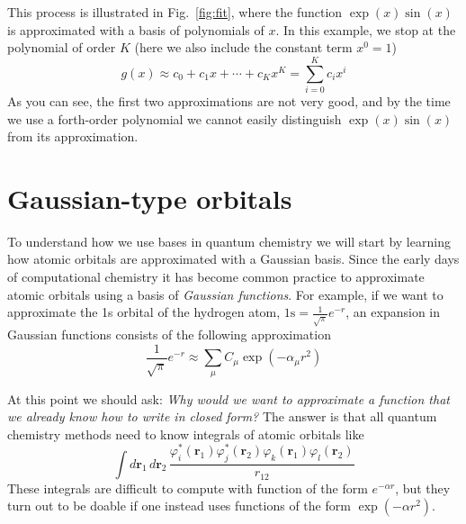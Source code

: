 \documentclass[../Main/chem371-notes.tex]{subfiles}
\begin{document}
This process is illustrated in Fig.~\ref{fig:fit}, where the function $\exp(x) \sin(x)$ is approximated with a basis of polynomials of $x$.
In this example, we stop at the polynomial of order $K$ (here we also include the constant term $x^0 = 1$)
\begin{equation}
g(x) \approx  c_0 +  c_1 x + \cdots + c_K x^{K} = \sum_{i=0}^{K} c_i x^{i}
\end{equation}
As you can see, the first two approximations are not very good, and by the time we use a forth-order polynomial we cannot easily distinguish $\exp(x) \sin(x)$ from its approximation.

\section{Gaussian-type orbitals}

To understand how we use bases in quantum chemistry we will start by learning how atomic orbitals are approximated with a Gaussian basis.
Since the early days of computational chemistry it has become common practice to approximate atomic orbitals using a basis of \emph{Gaussian functions}.
For example, if we want to approximate the 1s orbital of the hydrogen atom, $\mathrm{1s}=  \frac{1}{\sqrt{\pi}} e^{-r}$, an expansion in Gaussian functions consists of the following approximation
\begin{equation}
\frac{1}{\sqrt{\pi}} e^{-r} \approx \sum_\mu C_\mu \exp(- \alpha_\mu r^2)
\end{equation}

At this point we should ask: \emph{Why would we want to approximate a function that we already know how to write in closed form?}
The answer is that all quantum chemistry methods need to know integrals of atomic orbitals like
\begin{equation}
\int d\mathbf{r}_1 \, d\mathbf{r}_2 \, \frac{\varphi^*_i(\mathbf{r}_1) \varphi^*_j(\mathbf{r}_2) \varphi_k(\mathbf{r}_1) \varphi_l(\mathbf{r}_2)}{r_{12}}
\end{equation}
These integrals are difficult to compute with function of the form $e^{-\alpha r}$, but they turn out to be doable if one instead uses functions of the form $\exp(- \alpha r^2)$.
\end{document}
